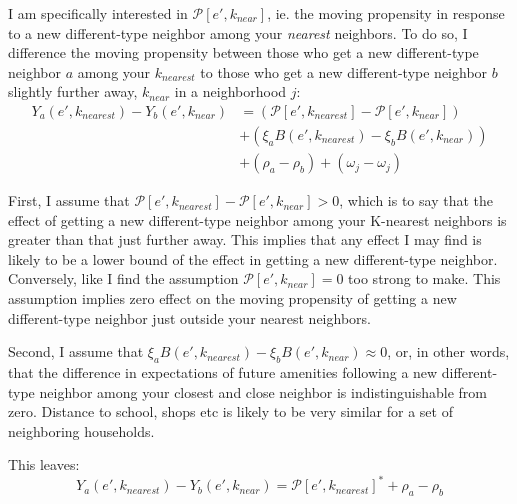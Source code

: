 \documentclass[../main.tex]{subfiles}
\begin{document}
I am specifically interested in $\mathcal{P}[e', k_{near}]$, ie. the moving propensity in response to a new different-type neighbor among your \textit{nearest} neighbors. To do so, I difference the moving propensity between those who get a new different-type neighbor $a$ among your $k_{nearest}$ to those who get a new different-type neighbor $b$ slightly further away, $k_{near}$ in a neighborhood $j$:
\begin{equation}
\begin{split}
    Y_a(e', k_{nearest}) - Y_b(e', k_{near}) &=( \mathcal{P}[e', k_{nearest}] - \mathcal{P}[e', k_{near}]) \\
    &+ (\xi_a B(e', k_{nearest}) - \xi_b B(e', k_{near})) \\
    &+ (\rho_a - \rho_b)  + (\omega_j - \omega_j)
\end{split}
\label{eq:move_propensity_diff}
\end{equation}


First, I assume that $\mathcal{P}[e', k_{nearest}] - \mathcal{P}[e', k_{near}] > 0$, which is to say that the effect of getting a new different-type neighbor among your K-nearest neighbors is greater than that just further away. This implies that any effect I may find is likely to be a lower bound of the effect in getting a new different-type neighbor. Conversely, like \textcite{Bayer_2022_nearest_neighbor} I find the assumption $\mathcal{P}[e', k_{near}] = 0$ too strong to make. This assumption implies zero effect on the moving propensity of getting a new different-type neighbor just outside your nearest neighbors. 

Second, I assume that $\xi_a B(e', k_{nearest}) - \xi_b B(e', k_{near})\approx0$, or, in other words, that the difference in expectations of future amenities following a new different-type neighbor among your closest and close neighbor is indistinguishable from zero. Distance to school, shops etc is likely to be very similar for a set of neighboring households. 

This leaves:
\begin{equation}
    Y_a(e', k_{nearest}) - Y_b(e', k_{near}) = \mathcal{P}[e', k_{nearest}]^* + \rho_a - \rho_b
\end{equation}
\end{document}
